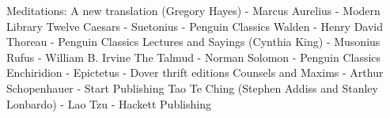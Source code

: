 \begin{thebibliography}{99}

   Meditations: A new translation (Gregory Hayes) - Marcus Aurelius - Modern Library
    Twelve Caesars -  Suetonius - Penguin Classics
     Walden - Henry David Thoreau - Penguin Classics
    Lectures and Sayings (Cynthia King) - Musonius Rufus - William B. Irvine
      The Talmud - Norman Solomon - Penguin Classics
     Enchiridion - Epictetus - Dover thrift editions
    Counsels and Maxims - Arthur Schopenhauer - Start Publishing
    Tao Te Ching (Stephen Addiss and Stanley Lonbardo) - Lao Tzu - Hackett Publishing 

\end{thebibliography}
